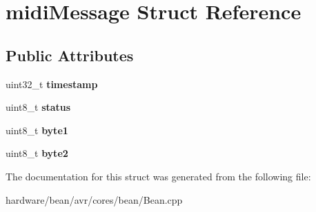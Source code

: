 \hypertarget{structmidi_message}{}\section{midi\+Message Struct Reference}
\label{structmidi_message}
\subsection*{Public Attributes}
\begin{DoxyCompactItemize}
\item 
\hypertarget{structmidi_message_aff11ffc6279329a8f9d89e977ed87d23}{}uint32\+\_\+t {\bfseries timestamp}\label{structmidi_message_aff11ffc6279329a8f9d89e977ed87d23}

\item 
\hypertarget{structmidi_message_a41be41ef4c9957252f5e5dc3c4fa2ac2}{}uint8\+\_\+t {\bfseries status}\label{structmidi_message_a41be41ef4c9957252f5e5dc3c4fa2ac2}

\item 
\hypertarget{structmidi_message_a4588ea597628d2c20a3ef8b702166fea}{}uint8\+\_\+t {\bfseries byte1}\label{structmidi_message_a4588ea597628d2c20a3ef8b702166fea}

\item 
\hypertarget{structmidi_message_a28f27c085f43eebcc296153d13ab27e1}{}uint8\+\_\+t {\bfseries byte2}\label{structmidi_message_a28f27c085f43eebcc296153d13ab27e1}

\end{DoxyCompactItemize}


The documentation for this struct was generated from the following file\+:\begin{DoxyCompactItemize}
\item 
hardware/bean/avr/cores/bean/Bean.\+cpp\end{DoxyCompactItemize}
